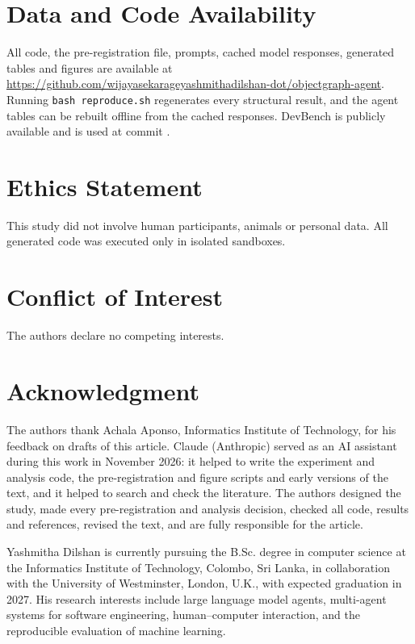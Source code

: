 \IfFileExists{ieeeaccess.cls}{\documentclass{ieeeaccess}\def\OFFICIALIEEEACCESS{1}}{\documentclass[journal]{IEEEtran}}
\begin{document}


\section*{Data and Code Availability}
All code, the pre-registration file, prompts, cached model responses, generated tables and figures are available at \url{https://github.com/wijayasekarageyashmithadilshan-dot/objectgraph-agent}. Running \texttt{bash reproduce.sh} regenerates every structural result, and the agent tables can be rebuilt offline from the cached responses. DevBench is publicly available and is used at commit \texttt{\DevBenchCommit}.

\section*{Ethics Statement}
This study did not involve human participants, animals or personal data. All generated code was executed only in isolated sandboxes.

\section*{Conflict of Interest}
The authors declare no competing interests.

\section*{Acknowledgment}
The authors thank Achala Aponso, Informatics Institute of Technology, for his feedback on drafts of this article. Claude (Anthropic) served as an AI assistant during this work in November 2026: it helped to write the experiment and analysis code, the pre-registration and figure scripts and early versions of the text, and it helped to search and check the literature. The authors designed the study, made every pre-registration and analysis decision, checked all code, results and references, revised the text, and are fully responsible for the article.




\appendices


\begin{IEEEbiographynophoto}{Yashmitha Dilshan}
is currently pursuing the B.Sc. degree in computer science at the Informatics Institute of Technology, Colombo, Sri Lanka, in collaboration with the University of Westminster, London, U.K., with expected graduation in 2027. His research interests include large language model agents, multi-agent systems for software engineering, human--computer interaction, and the reproducible evaluation of machine learning.
\end{IEEEbiographynophoto}
\end{document}
